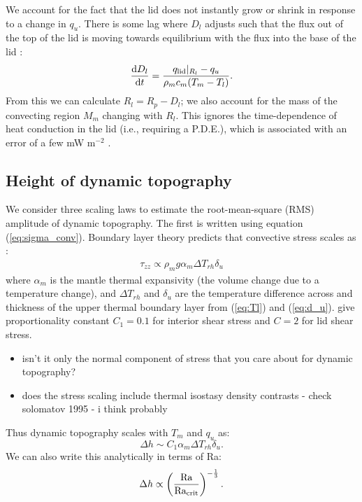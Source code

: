 We account for the fact that the lid does not instantly grow or shrink in response to a change in $q_{u}$. There is some lag where $D_l$ adjusts such that the flux out of the top of the lid is moving towards equilibrium with the flux into the base of the lid \citep{Thiriet2019}:
\begin{equation}\label{eq:D_l}
\frac{\mathrm{d} D_l}{\mathrm{d} t} = \frac{q_{\rm lid}\vert_{R_l} -q_u}{\rho_m c_{m} (T_m - T_l)} . 
\end{equation}
From this we can calculate $R_l = R_p - D_l$; we also account for the mass of the convecting region $M_m$ changing with $R_l$. This ignores the time-dependence of heat conduction in the lid (i.e., requiring a P.D.E.), which is associated with an error of a few mW m$^{-2}$ \citep{Thiriet2019}.




\subsection{Height of dynamic topography}

We consider three scaling laws to estimate the root-mean-square (RMS) amplitude of dynamic topography. The first is written using equation (\ref{eq:sigma_conv}). Boundary layer theory predicts that convective stress scales as \citep{Solomatov1995}:
\begin{align}
\tau_{zz} \propto \rho_m g \alpha_m \Delta T_{rh} \delta_u 
\end{align}
where $\alpha_m$ is the mantle thermal expansivity (the volume change due to a temperature change), and $\Delta T_{rh}$ and $\delta_u$ are the temperature difference across and thickness of the upper thermal boundary layer from (\ref{eq:Tl}) and (\ref{eq:d_u}). \citet{Reese2005} give proportionality constant $C_1 = 0.1$ for interior shear stress and $C = 2$ for lid shear stress.

\begin{itemize}
\item isn't it only the normal component of stress that you care about for dynamic topography?
\item does the stress scaling include thermal isostasy density contrasts - check solomatov 1995 - i think probably 
\end{itemize}

Thus dynamic topography scales with $T_m$ and $q_{u}$ as:
\begin{equation}\label{eq:dyn_top_stress}
\Delta h \sim C_1 \alpha_m \Delta T_{rh} \delta_u.
\end{equation}
We can also write this analytically in terms of Ra:
\begin{equation}
\Delta h \propto \left(\frac{\rm Ra}{\rm Ra_{\rm crit}}\right)^{-\frac{1}{3}}.
\end{equation}


